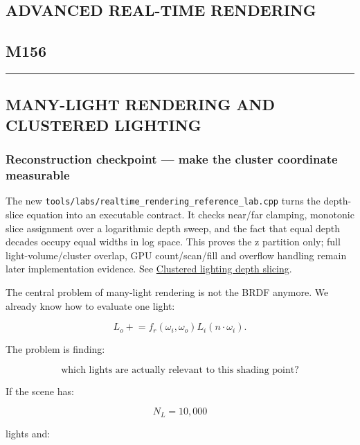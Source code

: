 \subsection{ADVANCED REAL-TIME RENDERING}\label{04-visual-computing-ii-ch040-advanced-real-time-rendering}

\subsection{M156}\label{04-visual-computing-ii-ch040-m156}

\begin{center}\rule{0.5\linewidth}{0.5pt}\end{center}

\subsection{MANY-LIGHT RENDERING AND CLUSTERED LIGHTING}\label{04-visual-computing-ii-ch040-many-light-rendering-and-clustered-lighting}

\subsubsection{Reconstruction checkpoint --- make the cluster coordinate measurable}\label{04-visual-computing-ii-ch040-reconstruction-checkpoint-make-the-cluster-coordinate-measurable}

The new \texttt{tools/labs/realtime\_rendering\_reference\_lab.cpp} turns the depth-slice equation into an executable contract. It checks near/far clamping, monotonic slice assignment over a logarithmic depth sweep, and the fact that equal depth decades occupy equal widths in log space. This proves the z partition only; full light-volume/cluster overlap, GPU count/scan/fill and overflow handling remain later implementation evidence. See \hyperref[appendix-b0efeb3f3648]{Clustered lighting depth slicing}.

The central problem of many-light rendering is not the BRDF anymore. We already know how to evaluate one light:

\[
L_o \mathrel{+}=
f_r(\omega_i,\omega_o)
L_i
(n\cdot\omega_i).
\]

The problem is finding:

\[
\boxed{
\text{which lights are actually relevant to this shading point?}
}
\]

If the scene has:

\[
N_L=10,000
\]

lights and:

